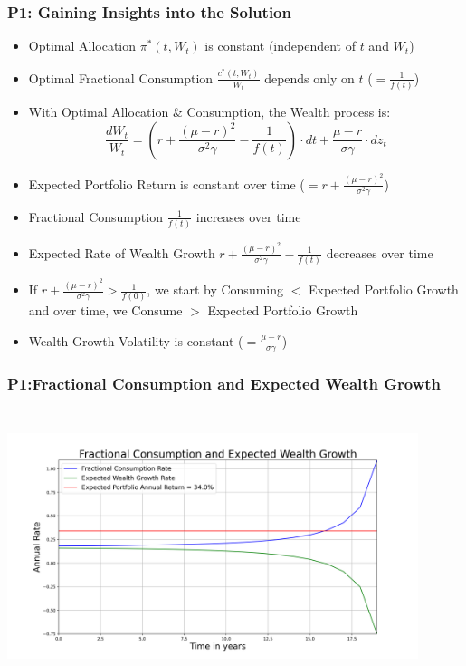 \documentclass[handout]{beamer}
\begin{document}
\begin{frame}
\frametitle{P1: Gaining Insights into the Solution}
\pause
\begin{itemize}[<+->]
\item Optimal Allocation $\pi^*(t, W_t)$ is constant (independent of $t$ and $W_t$)
\item Optimal Fractional Consumption $\frac {c^*(t, W_t)} {W_t}$ depends only on $t$ ($=\frac 1 {f(t)}$)
\item With Optimal Allocation \& Consumption, the Wealth process is:
$$\frac {dW_t} {W_t} = (r + \frac {(\mu - r)^2} {\sigma^2 \gamma} - \frac 1 {f(t)}) \cdot dt + \frac {\mu - r} {\sigma \gamma} \cdot dz_t$$
\item Expected Portfolio Return is constant over time ($=r + \frac {(\mu - r)^2} {\sigma^2 \gamma}$)
\item Fractional Consumption $\frac 1 {f(t)}$ increases over time
\item Expected Rate of Wealth Growth $r + \frac {(\mu - r)^2} {\sigma^2 \gamma} - \frac 1 {f(t)}$ decreases over time
\item If $r + \frac {(\mu - r)^2} {\sigma^2 \gamma} > \frac 1 {f(0)}$, we start by Consuming $<$ Expected Portfolio Growth and over time, we Consume $>$ Expected Portfolio Growth
\item Wealth Growth Volatility is constant ($= \frac {\mu - r} {\sigma \gamma}$)
\end{itemize}
\end{frame}

\begin{frame}
\frametitle{P1:Fractional Consumption and Expected Wealth Growth}
\includegraphics[width=12cm, height=8cm]{../finance/cme241/portfolio_growth.png}
\end{frame}
\end{document}
